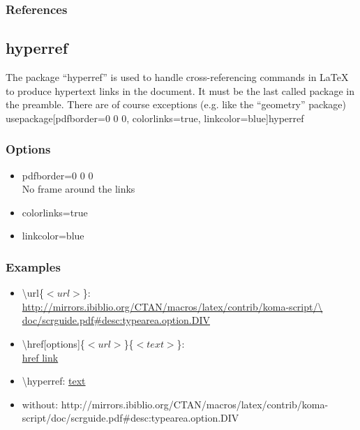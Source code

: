 \subsubsection{References}

\subsection{hyperref}
The package \enquote{hyperref} is used to handle cross-referencing commands in
LaTeX to produce hypertext links in the document. It must be the last called
package in the preamble. There are of course exceptions (e.g. like the
\enquote{geometry} package)
\\usepackage[pdfborder={0 0 0}, colorlinks=true, linkcolor=blue]{hyperref}
\subsubsection{Options}
\begin{itemize}
    \item{pdfborder={0 0 0}\\
        No frame around the links}
    \item{colorlinks=true}
    \item{linkcolor=blue}
\end{itemize}
\subsubsection{Examples}
\begin{itemize}
    \item{\textbackslash url\{$<url>$\}:\\
        \url{http://mirrors.ibiblio.org/CTAN/macros/latex/contrib/koma-script/\
        doc/scrguide.pdf\#desc:typearea.option.DIV}}
    \item{\textbackslash href[options]\{$<url>$\}\{$<text>$\}:\\
        \href{http://mirrors.ibiblio.org/CTAN/macros/latex/contrib/koma-script/doc/scrguide.pdf\#desc:typearea.option.DIV}{href link}}
    \item{\textbackslash hyperref: \hyperref{http://mirrors.ibiblio.org/CTAN/macros/latex/contrib/koma-script/doc/scrguide.pdf\#desc:typearea.option.DIV}{category}{name}{text}}
    \item{without: http://mirrors.ibiblio.org/CTAN/macros/latex/contrib/koma-script/doc/scrguide.pdf\#desc:typearea.option.DIV}
\end{itemize}
